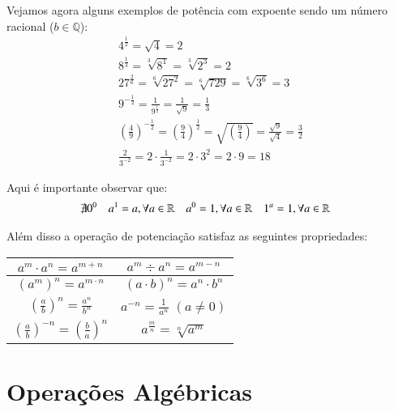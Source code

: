  \begin{exem}
  Vejamos agora alguns exemplos de potência com expoente sendo um número racional ($b \in \mathbb{Q}$):
  \begin{eqnarray*}
   4^{\frac{1}{2}}= \sqrt{4}= 2 \\
   8^{\frac{1}{3}}= \sqrt[3]{8^1}= \sqrt[3]{2^{3}}= 2 \\
   27^{\frac{2}{6}}= \sqrt[6]{27^2}= \sqrt[6]{729}= \sqrt[6]{3^6}= 3\\
   9^{-\frac{1}{2}}= \frac{1}{9^{\frac{1}{2}}}= \frac{1}{\sqrt{9}}= \frac{1}{3} \\
   \left(\frac{4}{9}\right)^{-\frac{1}{2}}= \left(\frac{9}{4}\right)^{\frac{1}{2}}= \sqrt{\left(\frac{9}{4}\right)}=\frac{\sqrt{9}}{\sqrt{4}}= \frac{3}{2} \\
   \frac{2}{3^{-2}}= 2 \cdot \frac{1}{3^{-2}}= 2 \cdot 3^{2}= 2 \cdot 9= 18
  \end{eqnarray*}

 \end{exem}

 
 \vskip0.3cm
 
 \colorbox{amarelo}{
 \begin{minipage}{14.5cm}
 \begin{center}
 Aqui é importante observar que:
 \begin{align*} 
 & \nexists 0^0 & & a^1= a, \forall a \in \mathbb{R} & & a^0= 1, \forall a \in \mathbb{R} & & 1^a= 1, \forall a \in \mathbb{R}
 \end{align*}
 \end{center}
 \end{minipage}}
 
 Além disso a operação de potenciação satisfaz as seguintes propriedades:
 
  \begin{table}[H]
 \centering
 \begin{tabular}{|c|c|} \hline
 $a^m \cdot a^n= a^{m + n}$ & $a^m \div a^n= a^{m - n}$ \\ \hline
 $(a^m)^n= a^{m \cdot n}$ & $(a \cdot b)^n= a^n \cdot b^n$ \\ \hline
 $\left(\frac{a}{b}\right)^n= \frac{a^n}{b^n}$ & $a^{-n}= \frac{1}{a^n}$ $(a \neq 0)$ \\ \hline
 $\left(\frac{a}{b} \right)^{-n}= \left(\frac{b}{a} \right)^{n}$ & $a^{\frac{m}{n}}= \sqrt[n]{a^m}$ \\\hline
 \end{tabular}
 \end{table}
 
 \section{Operações Algébricas}
 
